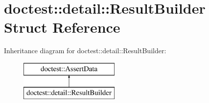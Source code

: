 \hypertarget{structdoctest_1_1detail_1_1_result_builder}{}\section{doctest\+::detail\+::Result\+Builder Struct Reference}
\label{structdoctest_1_1detail_1_1_result_builder}
Inheritance diagram for doctest\+::detail\+::Result\+Builder\+:\begin{figure}[H]
\begin{center}
\leavevmode
\includegraphics[height=2.000000cm]{structdoctest_1_1detail_1_1_result_builder}
\end{center}
\end{figure}
